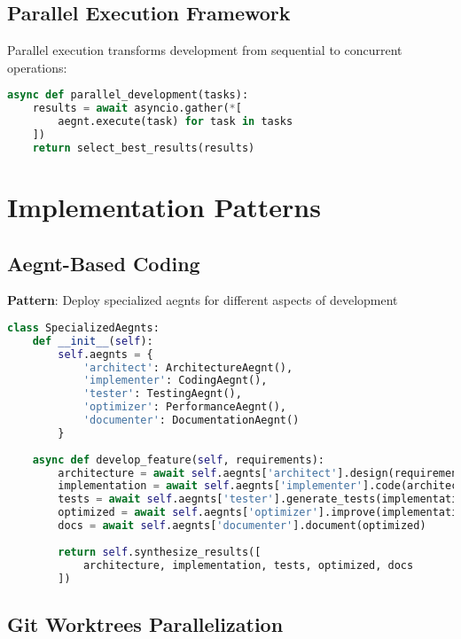 \documentclass[11pt]{article}
\begin{document}
\subsection{Parallel Execution Framework}

Parallel execution transforms development from sequential to concurrent operations:

\begin{lstlisting}[language=Python]
async def parallel_development(tasks):
    results = await asyncio.gather(*[
        aegnt.execute(task) for task in tasks
    ])
    return select_best_results(results)
\end{lstlisting}

\section{Implementation Patterns}

\subsection{Aegnt-Based Coding}

\textbf{Pattern}: Deploy specialized aegnts for different aspects of development

\begin{lstlisting}[language=Python]
class SpecializedAegnts:
    def __init__(self):
        self.aegnts = {
            'architect': ArchitectureAegnt(),
            'implementer': CodingAegnt(),
            'tester': TestingAegnt(),
            'optimizer': PerformanceAegnt(),
            'documenter': DocumentationAegnt()
        }
    
    async def develop_feature(self, requirements):
        architecture = await self.aegnts['architect'].design(requirements)
        implementation = await self.aegnts['implementer'].code(architecture)
        tests = await self.aegnts['tester'].generate_tests(implementation)
        optimized = await self.aegnts['optimizer'].improve(implementation)
        docs = await self.aegnts['documenter'].document(optimized)
        
        return self.synthesize_results([
            architecture, implementation, tests, optimized, docs
        ])
\end{lstlisting}

\subsection{Git Worktrees Parallelization}
\end{document}

